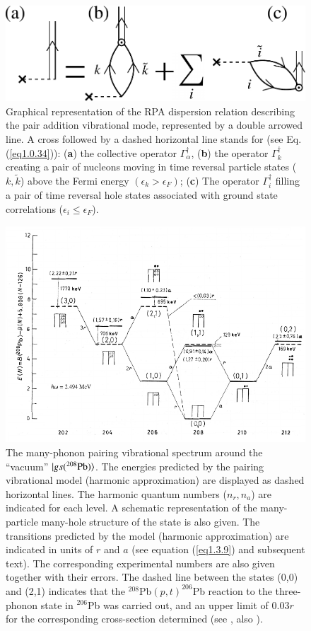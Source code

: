 \begin{figure}
	\centerline {
		\includegraphics*[width=12cm]{introduccion/figs/fig_preface_3_1}
	}
	\caption{Graphical representation of the RPA dispersion relation describing the pair addition  vibrational mode, represented by a double arrowed line.  A cross followed by a dashed horizontal line stands for (see Eq. (\ref{eq1.0.34})): (\textbf{a}) the collective operator $\Gamma_\alpha^\dagger$, (\textbf{b}) the operator $\Gamma_k^\dagger$ creating a pair of nucleons moving in time reversal particle states ($k,\tilde k$) above the Fermi energy $(\epsilon_k>\epsilon_F)$; (\textbf{c}) The operator $\Gamma^\dagger_i$ filling a pair of time reversal hole states associated with ground state correlations ($\epsilon_i\leq\epsilon_F$).}
	\label{fig0.3.1}
\end{figure}
\begin{figure}
	\centerline {
		\includegraphics*[width=15cm, angle=0.]{introduccion/figs/fig1_3_2}
	}
	\caption{The many-phonon pairing vibrational spectrum around the ``vacuum'' $|{gs(^{208}\text{Pb})} \rangle$. The energies predicted by the pairing vibrational model (harmonic approximation) are displayed as dashed horizontal lines. The harmonic quantum numbers ($n_r,n_a$) are indicated for each level. A schematic representation of the many-particle many-hole structure of the state is also given. The transitions predicted by the model (harmonic approximation) are indicated in units of $r$ and $a$ (see equation (\ref{eq1.3.9}) and subsequent text). The corresponding experimental numbers are also given together with their errors. The dashed line between the states (0,0) and (2,1) indicates that the $^{208}$Pb$(p,t)^{206}$Pb reaction to the three-phonon state in $^{206}$Pb was carried out, and an upper limit of 0.03$r$ for the corresponding cross-section  determined (see \cite{Flynn:72} \cite{Broglia:73}, also \cite{Lanford:73}).}
	\label{fig0.3.2}
\end{figure}

